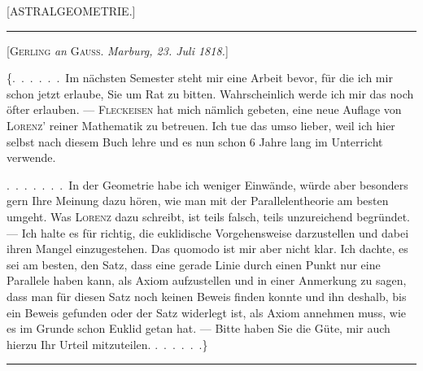 \clearpage{}
\begin{center}[ASTRALGEOMETRIE.]\end{center}

\begin{center}\rule{3cm}{0.4pt}\end{center}

\begin{center}[\textsc{Gerling} \emph{an} \textsc{Gauss}. \emph{Marburg, 23. Juli 1818.}]\end{center}

\{.\ .\ .\ .\ .\ .\ Im nächsten Semester steht mir eine Arbeit bevor, für die ich
mir schon jetzt erlaube, Sie um Rat zu bitten. Wahrscheinlich werde ich mir
das noch öfter erlauben. --- \textsc{Fleckeisen} hat mich
nämlich gebeten, eine neue Auflage von \textsc{Lorenz}’
reiner Mathematik zu betreuen. Ich tue das umso lieber, weil
ich hier selbst nach diesem Buch lehre und es nun schon 6 Jahre lang
im Unterricht verwende.

.\ .\ .\ .\ .\ .\ .\ In der Geometrie habe ich weniger Einwände, würde aber besonders
gern Ihre Meinung dazu hören, wie man mit der Parallelentheorie am besten
umgeht. Was \textsc{Lorenz} dazu schreibt, ist teils falsch, teils
unzureichend begründet. --- Ich halte es für richtig, die euklidische Vorgehensweise darzustellen und dabei
ihren Mangel einzugestehen. Das quomodo ist
mir aber nicht klar. Ich dachte, es sei am besten, den Satz, dass eine gerade
Linie durch einen Punkt nur eine Parallele haben kann, als Axiom
aufzustellen und in einer Anmerkung zu sagen, dass man für
diesen Satz noch keinen Beweis finden konnte und ihn deshalb, bis
ein Beweis gefunden oder der Satz widerlegt ist, als Axiom
annehmen muss, wie es im Grunde schon Euklid getan hat. --- Bitte haben Sie die
Güte, mir auch hierzu Ihr Urteil mitzuteilen. .\ .\ .\ .\ .\ .\}

\begin{center}\rule{3cm}{0.4pt}\end{center}


